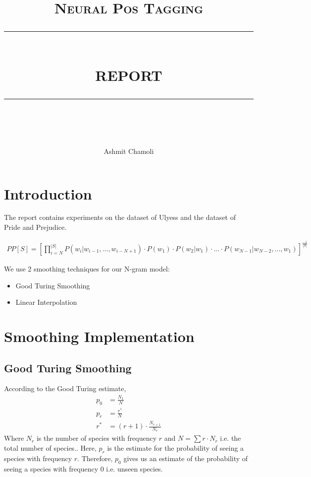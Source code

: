 \documentclass[a4paper,9pt]{report}
\newcommand{\HRule}[1]{\rule{\linewidth}{#1}}
\begin{document}
\title{ \normalsize \textsc{\LARGE Neural Pos Tagging}
		\\ [2.0cm]
		\HRule{0.5pt} \\
		\LARGE \textbf{\uppercase{Report}}
		\HRule{2pt} \\ [0.5cm]
		\normalsize \vspace*{3\baselineskip}}
        \date{ }

\author{Ashmit Chamoli\\ }

\maketitle
\section*{Introduction}
The report contains experiments on the dataset of Ulyess and the dataset of Pride and Prejudice.
 
\begin{align*}
    PP[S] = [\prod_{i=N}^{|S|} P(w_i | w_{i-1}, ..., w_{i-N+1}) \cdot P(w_1) \cdot P(w_2 | w_1) \cdot ... \cdot P(w_{N-1} | w_{N-2}, ..., w_1)] ^{\frac{-1}{|S|}}
\end{align*}

We use 2 smoothing techniques for our N-gram model:
\begin{itemize}
    \item Good Turing Smoothing
    \item Linear Interpolation
\end{itemize}

\section*{Smoothing Implementation}
\subsection*{Good Turing Smoothing}
According to the Good Turing estimate,
\begin{align*}
    p_0 &= \frac{N_1}{N} \\
    p_r &= \frac{r^*}{N} \\
    r^* &= (r+1) \cdot \frac{N_{r+1}}{N_r}
\end{align*}
Where $N_r$ is the number of species with frequency $r$ and $N = \sum r \cdot N_r$ i.e. the total number of species..
Here, $p_r$ is the estimate for the probability of seeing a species with frequency $r$. Therefore, $p_0$ gives us an estimate of the probability of seeing a species with frequency 0 i.e. unseen species.
\end{document}
